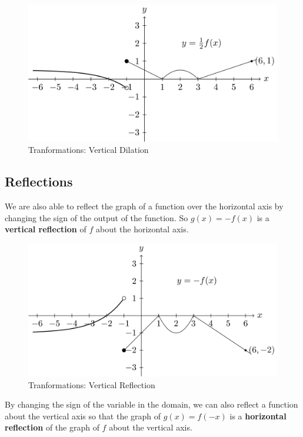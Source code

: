 \documentclass[
]{book}
\theoremstyle{definition}
\theoremstyle{definition}
\theoremstyle{definition}
\theoremstyle{remark}
\begin{document}
\begin{figure}

{\centering \includegraphics[width=0.8\linewidth]{tikz/vertical-dilation} 

}

\caption{Tranformations: Vertical Dilation}\label{fig:vertical-dilation}
\end{figure}

\hypertarget{reflections}{%
\subsection{Reflections}\label{reflections}}

We are also able to reflect the graph of a function over the horizontal axis by changing the sign of the output of the function. So \(g(x)=-f(x)\) is a \textbf{vertical reflection} of \(f\) about the horizontal axis.

\begin{figure}

{\centering \includegraphics[width=0.8\linewidth]{tikz/vertical-reflection} 

}

\caption{Tranformations: Vertical Reflection}\label{fig:vertical-reflection}
\end{figure}

By changing the sign of the variable in the domain, we can also reflect a function about the vertical axis so that the graph of \(g(x)=f(-x)\) is a \textbf{horizontal reflection} of the graph of \(f\) about the vertical axis.
\end{document}
